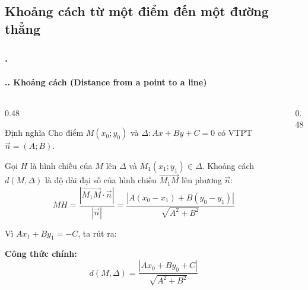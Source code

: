 \documentclass[11pt, aspectratio=169]{beamer}
\begin{document}
\subsection{Khoảng cách từ một điểm đến một đường thẳng}

\begin{frame}[fragile]
    \frametitle{\thesection. \insertsection}
    \framesubtitle{\thesection.\thesubsection. Khoảng cách (Distance from a point to a line)}
    \vspace{-0.3cm}

    \begin{columns}[T, onlytextwidth]
        \begin{column}{0.48\textwidth}
            \begin{block}{Định nghĩa}
                \footnotesize
                Cho điểm $M(x_0; y_0)$ và $\Delta: Ax + By + C = 0$ có VTPT $\vec{n}=(A; B)$. 
                
                \vspace{0.2cm}
                Gọi $H$ là hình chiếu của $M$ lên $\Delta$ và $M_1(x_1; y_1) \in \Delta$. Khoảng cách $d(M, \Delta)$ là độ dài đại số của hình chiếu $\overrightarrow{M_1M}$ lên phương $\vec{n}$:
                \[ MH = \frac{|\overrightarrow{M_1M} \cdot \vec{n}|}{|\vec{n}|} = \frac{|A(x_0-x_1) + B(y_0-y_1)|}{\sqrt{A^2 + B^2}} \]
                
                
                Vì $Ax_1 + By_1 = -C$, ta rút ra:

                \textbf{Công thức chính:} \\
                \[
                    \boxed{ d(M, \Delta) = \frac{|Ax_0 + By_0 + C|}{\sqrt{A^2 + B^2}} }
                \]
            \end{block}
        \end{column}
        
        \begin{column}{0.48\textwidth}
            \centering
            \vspace{0.4cm}
\end{column}
\end{columns}
\end{frame}
\end{document}
